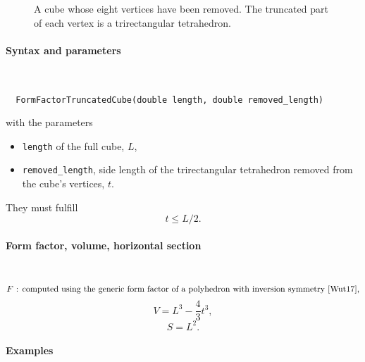 \begin{figure}[H]
\hfill
{}
\hfill
{}
\hfill
{}
\hfill
\caption{A cube whose eight vertices have been removed.
The truncated part of each vertex is a trirectangular tetrahedron.}
\end{figure}

\FloatBarrier

\paragraph{Syntax and parameters}\strut\\[-2ex plus .2ex minus .2ex]
\begin{lstlisting}
  FormFactorTruncatedCube(double length, double removed_length)
\end{lstlisting}
with the parameters
\begin{itemize}
\item \texttt{length} of the full cube, $L$,
\item \texttt{removed\_length}, side length of the trirectangular tetrahedron removed from the cube's vertices, $t$.
\end{itemize}
They must fulfill
\begin{displaymath}
  t \le L/2.
\end{displaymath}

\paragraph{Form factor, volume, horizontal section}\strut\\
\begin{equation*}
  F \text{~: computed using the generic form factor of a polyhedron
             with inversion symmetry~\cite{Wut17},}
\end{equation*}
\begin{equation*}
  V = L^3 - \dfrac{4}{3}t^3,
\end{equation*}
\begin{equation*}
  S = L^2.
\end{equation*}

\paragraph{Examples}\strut

